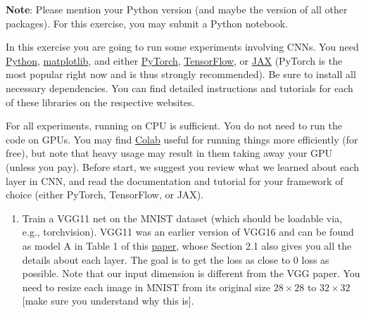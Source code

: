 \documentclass[10pt,letterpaper]{article}
\newcommand{\blue}[1]{{\color{blue}#1}}
\newcommand{\magenta}[1]{{\color{magenta}#1}}
\begin{document}
\begin{exercise}
	\blue{\textbf{Note}: Please mention your Python version (and maybe the version of all other packages). For this exercise, you may submit a Python notebook.}
	
	
  In this exercise you are going to run some experiments involving CNNs. You need \href{https://www.python.org/}{\magenta{Python}}, \href{https://matplotlib.org/}{\magenta{matplotlib}}, and either \href{https://pytorch.org/get-started/locally/}{\magenta{PyTorch}},  \href{https://www.tensorflow.org/tutorials/quickstart/beginner}{\magenta{TensorFlow}}, or \href{https://jax.readthedocs.io/en/latest/notebooks/quickstart.html}{\magenta{JAX}} (PyTorch is the most popular right now and is thus strongly recommended). 
  Be sure to install all necessary dependencies. You can find detailed instructions and tutorials for each of these libraries on the respective websites. 
	
	For all experiments, running on CPU is sufficient. 
  You do not need to run the code on GPUs.
  You may find \href{https://colab.research.google.com/}{Colab} useful for running things more efficiently (for free), but note that heavy usage may result in them taking away your GPU (unless you pay).
  Before start, we suggest you review what we learned about each layer in CNN, and read the documentation and tutorial for your framework of choice (either PyTorch, TensorFlow, or JAX).
	
  \begin{enumerate}[label=\alph*)]
    \item Train a VGG11 net on the MNIST dataset (which should be loadable via, e.g., torchvision). 
		VGG11 was an earlier version of VGG16 and can be found as model A in Table 1 of this \href{https://arxiv.org/pdf/1409.1556.pdf}{\magenta{paper}}, whose Section 2.1 also gives you all the details about each layer.
		The goal is to get the loss as close to 0 loss as possible. Note that our input dimension is different from the VGG paper. You need to resize each image in MNIST from its original size $28 \times 28$ to $32 \times 32$ [make sure you understand why this is].
		

\end{enumerate}
\end{exercise}
\end{document}
